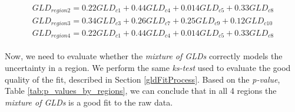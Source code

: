 \documentclass[11pt]{article}
\begin{document}
\begin{table}[!ht]
\begin{center}
    \caption {Distribution of the clusters by regions. The four regions are selected intentionally this way to warrant different distributions of the clusters inside it.}
    \label{tab:distribution_of_the_clusters_by_regions}
    \end{center}
\end{table}


\begin{align}
\begin{split}
\label{eq:gld_mix}
GLD_{region2} = 0.22GLD_{c1} + 0.44GLD_{c4} + 0.014GLD_{c5} + 0.33GLD_{c8} \\
 GLD_{region3} = 0.34GLD_{c3} + 0.26GLD_{c7} + 0.25GLD_{c9} + 0.12GLD_{c10} \\
 GLD_{region4} = 0.22GLD_{c1} + 0.44GLD_{c4} + 0.014GLD_{c5}  + 0.33GLD_{c8}
\end{split}
\end{align}


Now, we need to evaluate whether the \textit{mixture of GLDs} correctly models the uncertainty in a region. We perform the same \textit{ks-test} used to evaluate the
good quality of the fit, described in Section \ref{gldFitProcess}. Based on the \textit{p-value}, Table \ref{tab:p_values_by_regions}, we can conclude that in all 4 regions the \textit{mixture of GLDs} is a good fit to the raw data.
\end{document}
